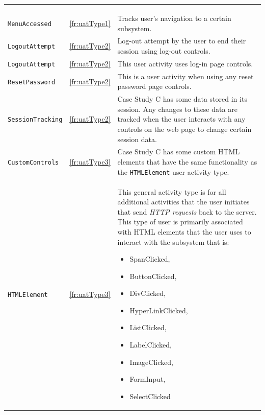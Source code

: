 \begin{xltabular}{\textwidth}{llX}
	\caption[Case Study A activity types]{\textit{Case Study A activity types}}\label{tbl:ch3_systemCActivityTypes}\\
	\toprule
	 &  &  \\
	\midrule
	\endfirsthead

	\caption[]{\continueCaption} \\
	\toprule
	 &  &  \\
	\midrule
	\endhead

	\midrule
	 \\ 
	\endfoot
	\endlastfoot

	\texttt{MenuAccessed} & \ref{fr:uatType1} & \RaggedRight Tracks user's navigation to a certain subsystem. \\ 
	\texttt{LogoutAttempt} & \ref{fr:uatType2} & \RaggedRight Log-out attempt by the user to end their session using log-out controls. \\ 
	\texttt{LogoutAttempt} & \ref{fr:uatType2} & \RaggedRight This user activity uses log-in page controls. \\
	\texttt{ResetPassword} & \ref{fr:uatType2} & \RaggedRight This is a user activity when using any reset password page controls. \\
	\texttt{SessionTracking} & \ref{fr:uatType2} & \RaggedRight Case Study C has some data stored in its session. Any changes to these data are tracked when the user interacts with any controls on the web page to change certain session data. \\
	\texttt{CustomControls} & \ref{fr:uatType3} & \RaggedRight Case Study C has some custom HTML elements that have the same functionality as the \texttt{HTMLElement} user activity type. \\ 
	\texttt{HTMLElement} & \ref{fr:uatType3} & \RaggedRight This general activity type is for all additional activities that the user initiates that send \textit{HTTP requests} back to the server. This type of user is primarily associated with HTML elements that the user uses to interact with the subsystem that is: \begin{itemize}
		\item SpanClicked,
		\item ButtonClicked, 
		\item DivClicked, 
		\item HyperLinkClicked,
		\item ListClicked, 
		\item LabelClicked, 
		\item ImageClicked, 
		\item FormInput, 
		\item SelectClicked
	\end{itemize} \\
	\bottomrule
\end{xltabular}

